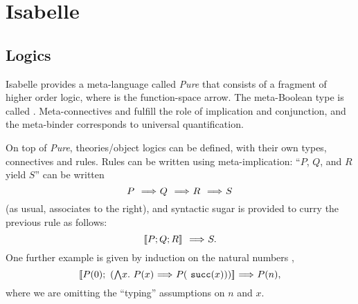 \section{Isabelle}
\label{sec:isabelle}
\subsection{Logics}
\label{sec:logics}
Isabelle \cite{Isabelle,DBLP:books/sp/Paulson94} provides a
meta-language called \emph{Pure} that consists of a fragment of higher
order logic, where \isatt{\isasymRightarrow} is the function-space
arrow. The meta-Boolean type is called . Meta-connectives
\isatt{\isasymLongrightarrow} and \isatt{\&\&\&} fulfill the role of
implication and conjunction, and the meta-binder \isatt{\isasymAnd}
corresponds to universal quantification.

On top of \emph{Pure}, theories/object logics can be defined, with
their own types, connectives and rules. Rules can be written  using
meta-implication: ``$P$, $Q$, and $R$ yield $S$'' can be written
\[
P \ \isatt{\isasymLongrightarrow}\ Q\ \isatt{\isasymLongrightarrow}\ R\ \isatt{\isasymLongrightarrow}\ S
\]
(as usual,  \isatt{\isasymLongrightarrow} associates to the right), and
syntactic sugar is provided to curry the previous rule as follows:
\[
\isasymlbrakk P; Q; R \isasymrbrakk \ \isatt{\isasymLongrightarrow}\ S.
\]
One further example is given by induction on the natural numbers
,
\[
\isasymlbrakk P(0);\ (\textstyle\isasymAnd
x.\ P(x)\ \isasymLongrightarrow\ P(\isatt{succ}(x))) \isasymrbrakk
\ \isasymLongrightarrow\ P(n), 
\]
where we are omitting the ``typing'' assumptions on $n$ and $x$.

